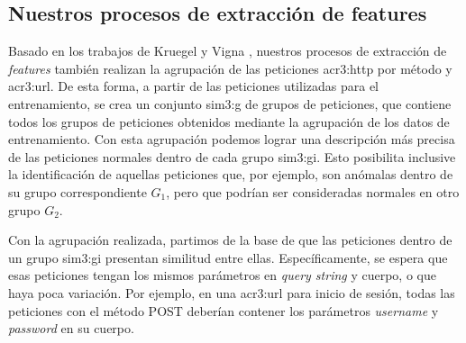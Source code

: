 \subsection{Nuestros procesos de extracción de features}

Basado en los trabajos de Kruegel y Vigna \cite{kruegel2003anomaly}
\cite{kruegel2005multi}, nuestros procesos de extracción de
\textit{features} también realizan la agrupación de las peticiones
\gls{acr3:http} por método y \gls{acr3:url}. De esta forma, a partir de
las peticiones utilizadas para el entrenamiento, se crea
un conjunto \gls{sim3:g} de grupos de peticiones, que contiene todos
los grupos de peticiones obtenidos mediante la agrupación de los datos
de entrenamiento.
Con esta agrupación podemos lograr una descripción más precisa de las
peticiones normales dentro de cada grupo \gls{sim3:gi}. Esto posibilita
inclusive la identificación de aquellas peticiones que, por ejemplo, son
anómalas dentro de su grupo correspondiente $G_{1}$, pero que podrían ser
consideradas normales en otro grupo $G_{2}$.

Con la agrupación realizada, partimos de la base de que las peticiones
dentro de un grupo \gls{sim3:gi} presentan similitud entre ellas.
Específicamente, se espera que esas peticiones tengan los mismos parámetros
en \textit{query string} y cuerpo, o que haya poca variación.
Por ejemplo, en una \gls{acr3:url} para inicio de sesión,
todas las peticiones con el método POST deberían contener los parámetros
\textit{username} y \textit{password} en su cuerpo.

